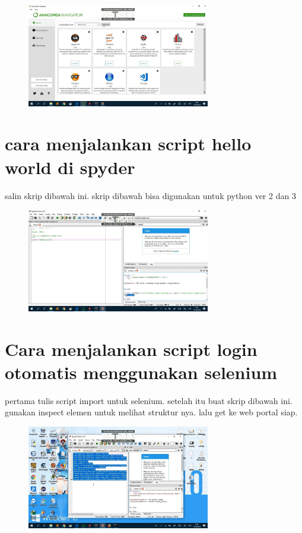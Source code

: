 \begin{figure}[H]
	\centering
	\includegraphics[width=8cm]{figures/6-10.jpg}
\end{figure}

\section{cara menjalankan script hello world di spyder}
	salin skrip dibawah ini. skrip dibawah bisa digunakan untuk python ver 2 dan 3
\begin{figure}[H]
	\centering
	\includegraphics[width=8cm]{figures/he.jpg}
\end{figure}

\section{Cara menjalankan script login otomatis menggunakan selenium}
	pertama tulis script import untuk selenium. setelah itu buat skrip dibawah ini. gunakan inspect elemen untuk melihat struktur nya. lalu get ke web portal siap.
\begin{figure}[H]
	\centering
	\includegraphics[width=8cm]{figures/rush.jpg}
\end{figure}

